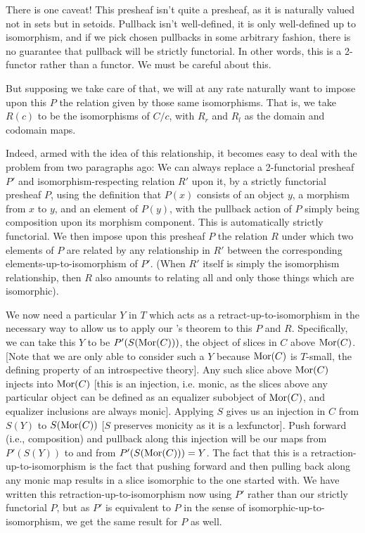 There is one caveat! This presheaf isn't quite a presheaf, as it is naturally valued not in sets but in setoids. Pullback isn't well-defined, it is only well-defined up to isomorphism, and if we pick chosen pullbacks in some arbitrary fashion, there is no guarantee that pullback will be strictly functorial. In other words, this is a 2-functor rather than a functor. We must be careful about this.

But supposing we take care of that, we will at any rate naturally want to impose upon this $P$ the relation given by those same isomorphisms. That is, we take $R(c)$ to be the isomorphisms of $C/c$, with $R_r$ and $R_l$ as the domain and codomain maps.

Indeed, armed with the idea of this relationship, it becomes easy to deal with the problem from two paragraphs ago: We can always replace a 2-functorial presheaf $P'$ and isomorphism-respecting relation $R'$ upon it, by a strictly functorial presheaf $P$, using the definition that $P(x)$ consists of an object $y$, a morphism from $x$ to $y$, and an element of $P(y)$, with the pullback action of $P$ simply being composition upon its morphism component. This is automatically strictly functorial. We then impose upon this presheaf $P$ the relation $R$ under which two elements of $P$ are related by any relationship in $R'$ between the corresponding elements-up-to-isomorphism of $P'$. (When $R'$ itself is simply the isomorphism relationship, then $R$ also amounts to relating all and only those things which are isomorphic). 

We now need a particular $Y$ in $T$ which acts as a retract-up-to-isomorphism in the necessary way to allow us to apply our \Loeb's theorem to this $P$ and $R$. Specifically, we can take this $Y$ to be $P'(S(\operatorname{Mor}(C)))$, the object of slices in $C$ above $\operatorname{Mor}(C)$. [Note that we are only able to consider such a $Y$ because $\operatorname{Mor}(C)$ is $T$-small, the defining property of an introspective theory]. Any such slice above $\operatorname{Mor}(C)$ injects into $\operatorname{Mor}(C)$ [this is an injection, i.e. monic, as the slices above any particular object can be defined as an equalizer subobject of $\operatorname{Mor}(C)$, and equalizer inclusions are always monic]. Applying $S$ gives us an injection in $C$ from $S(Y)$ to $S(\operatorname{Mor}(C))$ [$S$ preserves monicity as it is a lexfunctor]. Push forward (i.e., composition) and pullback along this injection will be our maps from $P'(S(Y))$ to and from $P'(S(\operatorname{Mor}(C))) = Y$. The fact that this is a retraction-up-to-isomorphism is the fact that pushing forward and then pulling back along any monic map results in a slice isomorphic to the one started with. We have written this retraction-up-to-isomorphism now using $P'$ rather than our strictly functorial $P$, but as $P'$ is equivalent to $P$ in the sense of isomorphic-up-to-isomorphism, we get the same result for $P$ as well. 

